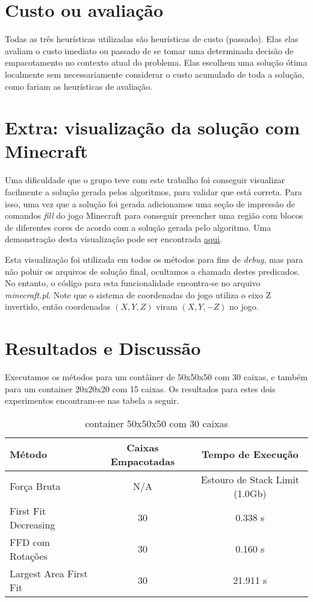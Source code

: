 \documentclass[12pt]{article}
\begin{document}
\section{Custo ou avaliação}

Todas as três heurísticas utilizadas são heurísticas de custo (passado). Elas elas avaliam o custo imediato ou passado de se tomar uma determinada decisão de empacotamento no contexto atual do problema. Elas escolhem uma solução ótima localmente sem necessariamente considerar o custo acumulado de toda a solução, como fariam as heurísticas de avaliação.

\section{Extra: visualização da solução com Minecraft}

Uma dificuldade que o grupo teve com este trabalho foi conseguir visualizar facilmente a solução gerada pelos algoritmos, para validar que está correta. Para isso, uma vez que a solução foi gerada adicionamos uma seção de impressão de comandos \textit{fill} do jogo Minecraft para conseguir preencher uma região com blocos de diferentes cores de acordo com a solução gerada pelo algoritmo. Uma demonstração desta visualização pode ser encontrada \href{https://www.youtube.com/watch?v=qInZZb9y1dQ}{aqui}.

Esta visualização foi utilizada em todos os métodos para fins de \textit{debug}, mas para não poluir os arquivos de solução final, ocultamos a chamada destes predicados. No entanto, o código para esta funcionalidade encontra-se no arquivo \textit{minecraft.pl}. Note que o sistema de coordenadas do jogo utiliza o eixo Z invertido, então coordenadas $(X, Y, Z)$ viram $(X, Y, -Z)$ no jogo.

\section{Resultados e Discussão}

Executamos os métodos para um contâiner de 50x50x50 com 30 caixas, e também para um container 20x20x20 com 15 caixas. Os resultados para estes dois experimentos encontram-se nas tabela a seguir.

\begin{table}[H]
	\centering
	\caption{container 50x50x50 com 30 caixas}
	\begin{tabular}{lcc}
		\toprule
		\textbf{Método}        & \textbf{Caixas Empacotadas} & \textbf{Tempo de Execução}     \\
		\midrule
		Força Bruta            & N/A                         & Estouro de Stack Limit (1.0Gb) \\
		First Fit Decreasing   & 30                          & 0.338 s                        \\
		FFD com Rotações       & 30                          & 0.160 s                        \\
		Largest Area First Fit & 30                          & 21.911 s                       \\
		\bottomrule
	\end{tabular}
	\label{tab:resultados_50}
\end{table}
\end{document}
